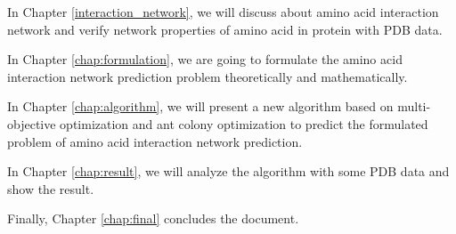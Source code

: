In Chapter \ref{interaction_network}, we will discuss about amino acid interaction network and verify network properties of amino acid in protein with PDB data.

In Chapter \ref{chap:formulation}, we are going to formulate the amino acid interaction network prediction problem theoretically and mathematically. 

In Chapter \ref{chap:algorithm}, we will present a new algorithm based on multi-objective optimization and ant colony optimization to predict the formulated problem of amino acid interaction network prediction.

In Chapter \ref{chap:result}, we will analyze the algorithm with some PDB data and show the result.

Finally, Chapter \ref{chap:final} concludes the document.

